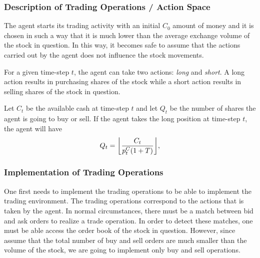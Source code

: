 \documentclass[twocolumn,aps,pra,superscriptaddress,nofootinbib,longbibliography]{revtex4-2}
\DeclarePairedDelimiter\floor{\lfloor}{\rfloor}
\begin{document}

 


\subsubsection{Description of Trading Operations / Action Space}
The agent starts its trading activity with an initial \(C_0\) amount of money and it is chosen in such a way that it is much lower than the average exchange volume of the stock in question. In this way, it becomes safe to assume that the actions carried out by the agent does not influence the stock movements. 

For a given time-step \(t\), the agent can take two actions: \textit{long} and \textit{short}. A long action results in purchasing shares of the stock while a short action results in selling shares of the stock in question. 

Let \(C_t\) be the available cash at time-step \(t\) and let \(Q_t\) be the number of shares the agent is going to buy or sell. If the agent takes the long position at time-step \(t\), the agent will have 
\begin{equation}
    Q_t = \floor*{\dfrac{C_{t}}{p_t^C (1 + T)}},
\end{equation} 


\subsubsection{Implementation of Trading Operations}



One first needs to implement the trading operations to be able to implement the trading environment. The trading operations correspond to the actions that is taken by the agent. In normal circumstances, there must be a match between bid and ask orders to realize a trade operation. In order to detect these matches, one must be able access the order book of the stock in question. However, since assume that the total number of buy and sell orders are much smaller than the volume of the stock, we are going to implement only buy and sell operations. 
\end{document}
